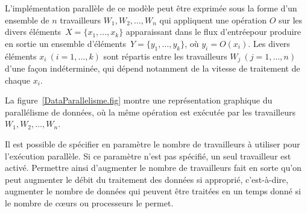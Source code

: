 



L'impl\'ementation parall\`ele de ce mod\`ele peut \^etre
exprim\'ee sous la forme d'un ensemble de $n$ travailleurs $W_1, W_2,\ldots, W_n$ qui
appliquent une op\'eration $O$ sur les divers \'el\'ements~$X = \{x_1, \ldots, x_k\}$ apparaissant dans
le flux d'entr\'eepour produire en sortie un ensemble d'\'el\'ements~$Y = \{y_1, \ldots, y_k\}$, o\`u $y_i = O(x_i)$.
%
Les divers \'el\'ements $x_i~(i=1, \ldots, k)$ sont r\'epartis entre
les travailleurs $W_j~(j=1, \ldots, n)$ d'une fa\c{c}on
ind\'etermin\'ee, qui d\'epend notamment de la vitesse de traitement
de chaque $x_i$.
%

La figure~\ref{DataParallelisme.fig} montre une repr\'esentation graphique du parall\'elisme de donn\'ees, o\`u la m\^eme op\'eration est ex\'ecut\'ee par les travailleurs $W_1, W_2,\ldots, W_n$. 

Il est possible de sp\'ecifier en param\`etre le nombre de travailleurs \`a utiliser pour l'ex\'ecution parall\`ele. Si ce param\`etre n'est pas sp\'ecifi\'e, un seul travailleur est activ\'e. Permettre ainsi d'augmenter le nombre de travailleurs fait en sorte qu'on peut augmenter le d\'ebit du traitement des donn\'ees si appropri\'e, c'est-\`a-dire, augmenter le nombre de donn\'ees qui peuvent \^etre trait\'ees en un temps donn\'e si le nombre de c\oe{}urs ou processeurs le permet.




